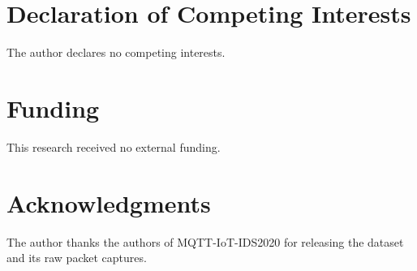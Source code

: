 \documentclass[journal]{IEEEtran}
\begin{document}
\section*{Declaration of Competing Interests}
The author declares no competing interests.

\section*{Funding}
This research received no external funding.

\section*{Acknowledgments}
The author thanks the authors of MQTT-IoT-IDS2020 for releasing the dataset
and its raw packet captures.



\end{document}
